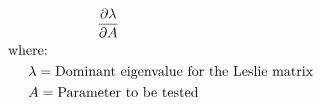 \documentclass[12pt]{article}
\begin{document}
\begin{preview}
\begin{align}
\frac{\partial \lambda}{\partial A}&  \nonumber \\ 
& \hspace{-1.1in} \text{where:} \nonumber \\
& \hspace{-0.9in} \lambda = \text{Dominant eigenvalue for the Leslie matrix} \nonumber \\
& \hspace{-0.9in} A = \text{Parameter to be tested} \nonumber
\end{align}
\end{preview}
\end{document}
